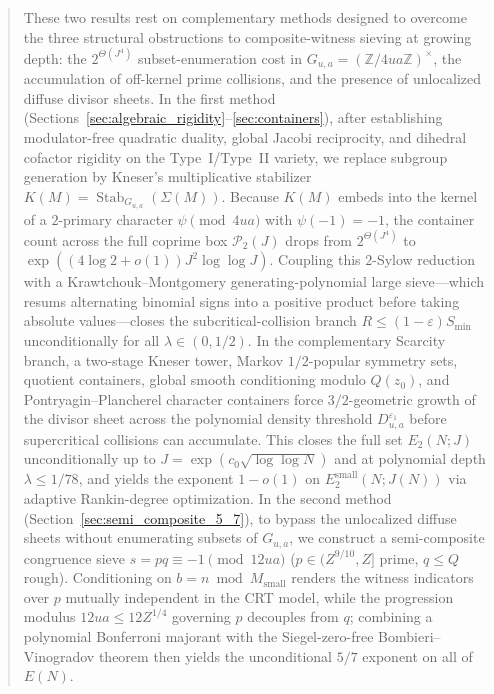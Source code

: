 \documentclass[11pt, a4paper]{article}
\theoremstyle{plain}
\theoremstyle{definition}
\newcommand{\Z}{\mathbb{Z}}
\begin{document}
\begin{abstract}
These two results rest on complementary methods designed to overcome the three structural obstructions to composite-witness sieving at growing depth: the $2^{\Theta(J^{4})}$ sub\-set-enu\-mer\-a\-tion cost in $G_{u,a}=(\Z/4ua\Z)^{\times}$, the accumulation of off-kernel prime collisions, and the presence of unlocalized diffuse divisor sheets. In the first method (Sections~\ref{sec:algebraic_rigidity}--\ref{sec:containers}), after establishing modulator-free quadratic duality, global Jacobi reciprocity, and dihedral cofactor rigidity on the Type~I/Type~II variety, we replace subgroup generation by Kneser's multiplicative stabilizer $K(M)=\operatorname{Stab}_{G_{u,a}}(\Sigma(M))$. Because $K(M)$ embeds into the kernel of a $2$-primary character $\psi\pmod{4ua}$ with $\psi(-1)=-1$, the container count across the full coprime box $\mathcal{P}_2(J)$ drops from $2^{\Theta(J^{4})}$ to $\exp((4\log 2+o(1))J^{2}\log\log J)$. Coupling this $2$-Sylow reduction with a Krawtchouk--Montgomery generating-polynomial large sieve—which resums alternating binomial signs into a positive product before taking absolute values—closes the subcritical-collision branch $R\le(1-\varepsilon)S_{\min}$ unconditionally for all $\lambda\in(0,1/2)$. In the complementary Scarcity branch, a two-stage Kneser tower, Markov $1/2$-popular symmetry sets, quotient containers, global smooth conditioning modulo $Q(z_0)$, and Pontryagin--Plancherel character containers force $3/2$-geometric growth of the divisor sheet across the polynomial density threshold $D_{u,a}^{\varepsilon_1}$ before supercritical collisions can accumulate. This closes the full set $E_2(N;J)$ unconditionally up to $J=\exp(c_0\sqrt{\log\log N})$ and at polynomial depth $\lambda\le 1/78$, and yields the exponent $1-o(1)$ on $E_2^{\mathrm{small}}(N;J(N))$ via adaptive Rankin-degree optimization. In the second method (Section~\ref{sec:semi_composite_5_7}), to bypass the unlocalized diffuse sheets without enumerating subsets of $G_{u,a}$, we construct a semi-composite congruence sieve $s=pq\equiv-1\pmod{12ua}$ ($p\in(Z^{9/10},Z]$ prime, $q\le Q$ rough). Conditioning on $b=n\bmod M_{\mathrm{small}}$ renders the witness indicators over $p$ mutually independent in the CRT model, while the progression modulus $12ua\le 12Z^{1/4}$ governing $p$ decouples from $q$; combining a polynomial Bonferroni majorant with the Siegel-zero-free Bombieri--Vinogradov theorem then yields the unconditional $5/7$ exponent on all of $E(N)$.


\end{abstract}
\end{document}
